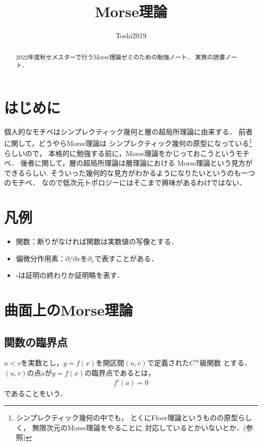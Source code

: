 \documentclass[11pt, a4paper, dvipdfmx]{jsarticle}
\theoremstyle{definition}
\newcommand{\p}{\partial}
\theoremstyle{mystyle}
\numberwithin{equation}{section} %
\begin{document}
\title{Morse理論}
\author{Toshi2019}
\date{}


\maketitle
\begin{abstract}
2022年度秋セメスターで行うMorse理論ゼミのための勉強ノート．
実質\cite{M01}の読書ノート．
\end{abstract}

\section*{はじめに}
個人的なモチベはシンプレクティック幾何と層の超局所理論に由来する．
前者に関して，どうやらMorse理論は
シンプレクティック幾何の原型になっている\footnote{
    シンプレクティック幾何の中でも，
    とくにFloer理論というものの原型らしく，
    無限次元のMorse理論をやることに
    対応しているとかいないとか．(\cite{Ono06}参照)
}らしいので，
本格的に勉強する前に，Morse理論をかじっておこうというモチベ．
後者に関して，層の超局所理論は層理論における
Morse理論という見方ができるらしい\cite{Ike21}.
そういった幾何的な見方がわかるようになりたいというのも一つのモチベ．
なので低次元トポロジーにはそこまで興味があるわけではない．

\section*{凡例}
\begin{itemize}
    \item 関数：断りがなければ関数は実数値の写像とする．
    \item 偏微分作用素：$\p/{\p x}$を$\p_x$で表すことがある．
    \item $\square$は証明の終わりか証明略を表す．
\end{itemize}

\section{曲面上のMorse理論}

\subsection{関数の臨界点}

$u<v$を実数とし，$y=f(x)$を開区間$(u,v)$で定義された$C^{\infty}$級関数
とする．$(u,v)$の点$a$が$y=f(x)$の臨界点であるとは，
\begin{align}
    f'(a)=0 \label{eq:1}
\end{align}
であることをいう．
\end{document}

